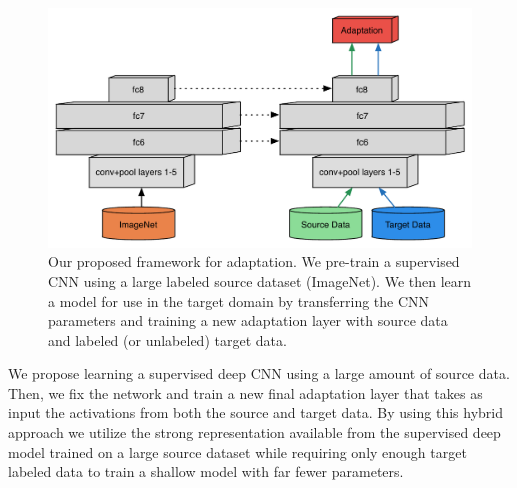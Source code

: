 \newcommand{\svmT}{\bm{\theta}}
\newcommand{\svmB}{b}
\newcommand{\svmAug}{\tilde{\svmT}}
\newcommand{\svmAugAll}{\bm{\Theta}}


\begin{figure}
\begin{center}
\includegraphics[width=.6\linewidth]{figs/model-adapt}
\end{center}
\caption{Our proposed framework for adaptation. We pre-train a supervised CNN using a large labeled source dataset (ImageNet). We then learn a model for use in the target domain by transferring the CNN parameters and training a new adaptation layer with source data and labeled (or unlabeled) target data.}
\label{fig:model-adapt}
\end{figure}


We propose learning a supervised deep CNN using a large amount of
source data. Then, we fix the network and train a new final adaptation layer
that takes as input the activations from both the source and target data. By
using this hybrid approach we utilize the strong representation available from
the supervised deep model trained on a large source dataset while requiring only
enough target labeled data to train a shallow model with far fewer parameters.

